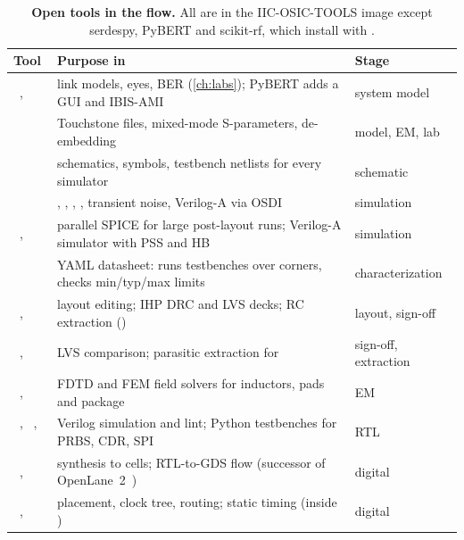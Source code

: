 \begin{table}[!tbp]
\centering
\caption{\textbf{Open tools in the \OS{} flow.} All are in the IIC-OSIC-TOOLS image except serdespy, PyBERT and scikit-rf, which install with .}
\label{tab:ch15-tools}
\footnotesize
\renewcommand{\arraystretch}{1.08}
\begin{tabularx}{\linewidth}{@{}>{\raggedright\arraybackslash}p{40mm} L l@{}}
\toprule
\textbf{Tool} & \textbf{Purpose in \OS{}} & \textbf{Stage}\\
\midrule
{}~\cite{serdespy}, ~\cite{pybert} & link models, eyes, BER (\cref{ch:labs}); PyBERT adds a GUI and IBIS-AMI & system model\\
~\cite{p2:skrf2022} & Touchstone files, mixed-mode S-parameters, de-embedding & model, EM, lab\\
~\cite{p6:xschem} & schematics, symbols, testbench netlists for every simulator & schematic\\
~\cite{p6:ngspice} & , , , , transient noise, Verilog-A via OSDI & simulation\\
~\cite{p6:xyce}, ~\cite{p6:vacask} & parallel SPICE for large post-layout runs; Verilog-A simulator with PSS and HB & simulation\\
~\cite{p6:cace} & YAML datasheet: runs testbenches over corners, checks min/typ/max limits & characterization\\
~\cite{p6:klayout}, ~\cite{p6:magic} & layout editing; IHP DRC and LVS decks; RC extraction () & layout, sign-off\\
~\cite{p6:netgen}, ~\cite{p6:klayoutpex} & LVS comparison; parasitic extraction for \sgx{} & sign-off, extraction\\
~\cite{p6:openems}, ~\cite{p6:palace} & FDTD and FEM field solvers for inductors, pads and package & EM\\
~\cite{p6:verilator}, ~\cite{p6:icarus}, ~\cite{p6:cocotb} & Verilog simulation and lint; Python testbenches for PRBS, CDR, SPI & RTL\\
~\cite{p6:yosys}, ~\cite{p6:librelane} & synthesis to \sgx{} cells; RTL-to-GDS flow (successor of OpenLane~2~\cite{p6:openlane2}) & digital\\
~\cite{p6:openroad}, ~\cite{p6:opensta} & placement, clock tree, routing; static timing (inside ) & digital\\
\bottomrule
\end{tabularx}
\end{table}

